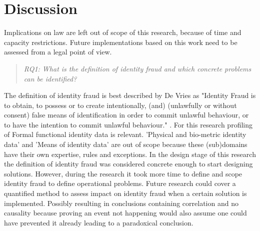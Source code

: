 \chapter{Discussion}\label{s:discussion}
Implications on law are left out of scope of this research, because of time and capacity restrictions. Future implementations based on this work need to be assessed from a legal point of view.

\begin{quote}\emph{RQ1: What is the definition of identity fraud and which concrete problems can be identified?}\end{quote}
The definition of identity fraud is best described by De Vries \etal as "Identity Fraud is to obtain, to possess or to create intentionally, (and) (unlawfully or without consent) false means of identification in order to commit unlawful behaviour, or to have the intention to commit unlawful behaviour." \cite{97408536fd1c4f4e9d1615b7a4a4473e}. For this research profiling of Formal functional identity data is relevant. 'Physical and bio-metric identity data' and 'Means of identity data' are out of scope because these (sub)domains have their own expertise, rules and exceptions. 
In the design stage of this research the definition of identity fraud was considered concrete enough to start designing solutions. However, during the research it took more time to define and scope identity fraud to define operational problems. Future research could cover a quantified method to assess impact on identity fraud when a certain solution is implemented. Possibly resulting in conclusions containing correlation and no causality because proving an event not happening would also assume one could have prevented it already leading to a paradoxical conclusion.\pagebreak

